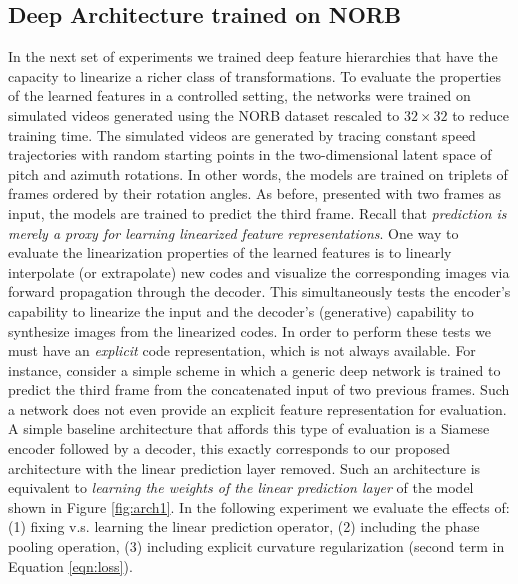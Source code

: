 \subsection{Deep Architecture trained on NORB}
\label{subsec:expr2} 
In the next set of experiments we trained deep feature hierarchies that have the capacity to linearize a richer class of transformations. To evaluate the properties of the learned features in a controlled setting, the networks were trained on simulated videos generated using the NORB dataset rescaled to $32 \times 32$ to reduce training time. The simulated videos are generated by tracing constant speed trajectories with random starting points in the two-dimensional latent space of pitch and azimuth rotations. In other words, the models are trained on triplets of frames ordered by their rotation angles. As before, presented with two frames as input, the models are trained to predict the third frame. Recall that \emph{prediction is merely a proxy for learning linearized feature representations}. One way to  evaluate the linearization properties of the learned features is to linearly interpolate (or extrapolate) new codes and visualize the corresponding images via forward propagation through the decoder. This simultaneously tests the encoder's capability to linearize the input and the decoder's (generative) capability to synthesize images from the linearized codes. In order to perform these tests we must have an \emph{explicit} code representation, which is not always available. For instance, consider a simple scheme in which a generic deep network is trained to predict the third frame from the concatenated input of two previous frames. Such a network does not even provide an explicit feature representation for evaluation. A simple baseline architecture that affords this type of evaluation is a Siamese encoder followed by a decoder, this exactly corresponds to our proposed architecture with the linear prediction layer removed. Such an architecture is equivalent to \emph{learning the weights of the linear prediction layer} of the model shown in Figure \ref{fig:arch1}. In the following experiment we evaluate the effects of: (1) fixing v.s. learning the linear prediction operator, (2) including the phase pooling operation, (3) including explicit curvature regularization (second term in Equation \ref{eqn:loss}).
        
